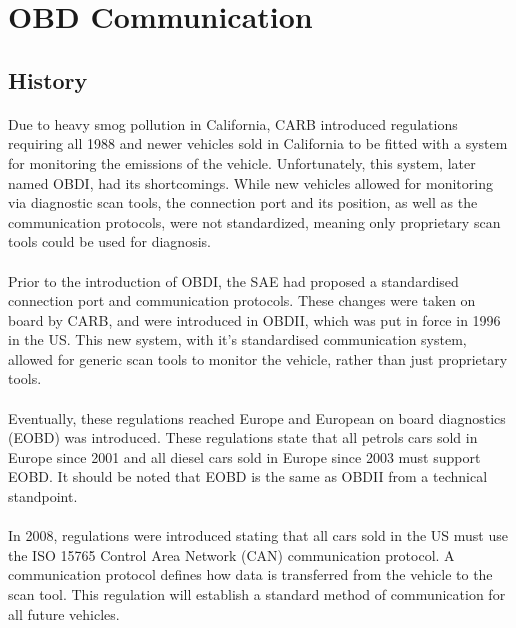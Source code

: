 \section{OBD Communication}
	\subsection{History}{
		\paragraph{}{
		Due to heavy smog pollution in California, CARB introduced regulations requiring all 1988 and newer vehicles sold in California to be fitted with a system for monitoring the emissions of the vehicle. Unfortunately, this system, later named OBDI, had its shortcomings. While new vehicles allowed for monitoring via diagnostic scan tools, the connection port and its position, as well as the communication protocols, were not standardized, meaning only proprietary scan tools could be used for diagnosis.
		}
		\paragraph{}{
		Prior to the introduction of OBDI, the SAE had proposed a standardised connection port and communication protocols. These changes were taken on board by CARB, and were introduced in OBDII, which was put in force in 1996 in the US. This new system, with it's standardised communication system, allowed for generic scan tools to monitor the vehicle, rather than just proprietary tools.  
		}	
		\paragraph{}{
		Eventually, these regulations reached Europe and European on board diagnostics (EOBD) was introduced. These regulations state that all petrols cars sold in Europe since 2001 and all diesel cars sold in Europe since 2003 must support EOBD. It should be noted that EOBD is the same as OBDII from a technical standpoint.
		}
		\paragraph{}{
		In 2008, regulations were introduced stating that all cars sold in the US must use the ISO 15765 Control Area Network (CAN) communication protocol. A communication protocol defines how data is transferred from the vehicle to the scan tool. This regulation will establish a standard method of communication for all future vehicles.
		}
	}	
